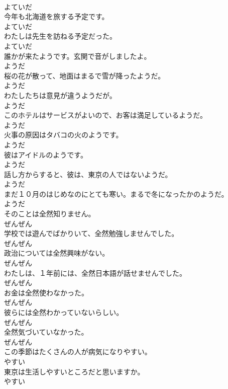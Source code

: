 \documentclass[8pt]{extreport}
\begin{document}
\begin{CJK}{UTF8}{min}
\\	よていだ
\\	今年も北海道を旅する予定です。	
\\	よていだ
\\	わたしは先生を訪ねる予定だった。	
\\	よていだ
\\	誰かが来たようです。玄関で音がしましたよ。	
\\	ようだ
\\	桜の花が散って、地面はまるで雪が降ったようだ。	
\\	ようだ
\\	わたしたちは意見が違うようだが。	
\\	ようだ
\\	このホテルはサービスがよいので、お客は満足しているようだ。	
\\	ようだ
\\	火事の原因はタバコの火のようです。	
\\	ようだ
\\	彼はアイドルのようです。	
\\	ようだ
\\	話し方からすると、彼は、東京の人ではないようだ。	
\\	ようだ
\\	まだ１０月のはじめなのにとても寒い。まるで冬になったかのようだ。	
\\	ようだ
\\	そのことは全然知りません。	
\\	ぜんぜん
\\	学校では遊んでばかりいて、全然勉強しませんでした。	
\\	ぜんぜん
\\	政治については全然興味がない。	
\\	ぜんぜん
\\	わたしは、１年前には、全然日本語が話せませんでした。	
\\	ぜんぜん
\\	お金は全然使わなかった。	
\\	ぜんぜん
\\	彼らには全然わかっていないらしい。	
\\	ぜんぜん
\\	全然気づいていなかった。	
\\	ぜんぜん
\\	この季節はたくさんの人が病気になりやすい。	
\\	やすい
\\	東京は生活しやすいところだと思いますか。	
\\	やすい

\end{CJK}
\end{document}

